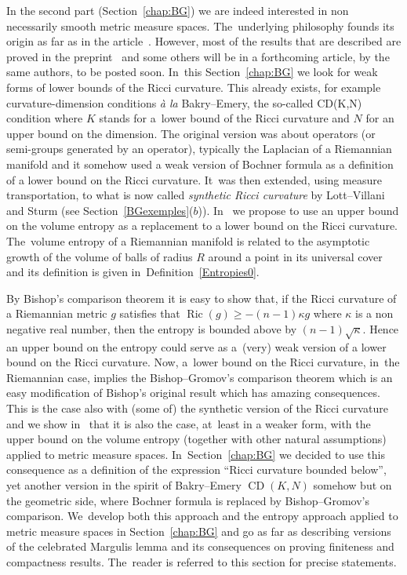 \documentclass[pdftex]{sigma}
\numberwithin{equation}{section}
\newcommand{\CDCD}{\operatorname{CD}}
\newcommand{\Ric}{\operatorname{Ric}}
\begin{document}
In the second part (Section~\ref{chap:BG}) we are indeed interested in non necessarily smooth metric measure spaces. The~underlying philosophy founds its origin as far as in the article~\cite{BCG-GAFA}. However, most of the results that are described are proved in the preprint~\cite{BCGS} and some others will be in a forthcoming article, by the same authors, to be posted soon. In~this Section~\ref{chap:BG} we look for weak forms of lower bounds of the Ricci curvature. This already exists, for example curvature-dimension conditions \textit{\`a la} Bakry--Emery, the so-called CD(K,N) condition where $K$ stands for a~lower bound of the Ricci curvature and $N$ for an upper bound on the dimension. The original version was about operators (or semi-groups generated by an operator), typically the Laplacian of a Riemannian manifold and it somehow used a weak version of Bochner formula as a definition of a lower bound on the Ricci curvature. It~was then extended, using measure transportation, to what is now called
\textit{synthetic Ricci curvature} by Lott--Villani and Sturm (see Section~\ref{BGexemples}($b$)). In~\cite{BCGS} we propose to use an upper bound on the volume entropy as a replacement to a lower bound on the Ricci curvature. The~volume entropy of a Riemannian manifold is related to the asymptotic growth of the volume of balls of radius $R$ around a point in its universal cover and its definition is given in~Definition~\ref{Entropies0}.

By Bishop's comparison theorem it is easy to show that, if the Ricci curvature of a Riemannian metric $g$ satisfies that $\Ric (g)\geq -(n-1)\kappa g$ where $\kappa$ is a non negative real number, then the entropy is bounded above by $(n-1)\sqrt \kappa$. Hence an upper bound on the entropy could serve as a~(very) weak version of a lower bound on the Ricci curvature. Now, a~lower bound on the Ricci curvature, in~the Riemannian case, implies the Bishop--Gromov's comparison theorem which is an easy modification of Bishop's original result which has amazing consequences. This is the case also with (some of) the synthetic version of the Ricci curvature and we show in~\cite{BCGS} that it is also the case, at~least in a weaker form, with the upper bound on the volume entropy (together with other natural assumptions) applied to metric measure spaces. In~Section~\ref{chap:BG} we decided to use this consequence as a definition of the expression
``Ricci curvature bounded below'', yet another version in the spirit of Bakry--Emery $\CDCD(K,N)$ somehow but on the geometric side, where Bochner formula is replaced by Bishop--Gromov's comparison. We~develop both this
approach and the entropy approach applied to metric measure spaces in Section~\ref{chap:BG} and go as far as describing versions of the celebrated Margulis lemma and its consequences on proving finiteness and compactness results. The~reader is referred to this section for precise statements.
\end{document}

